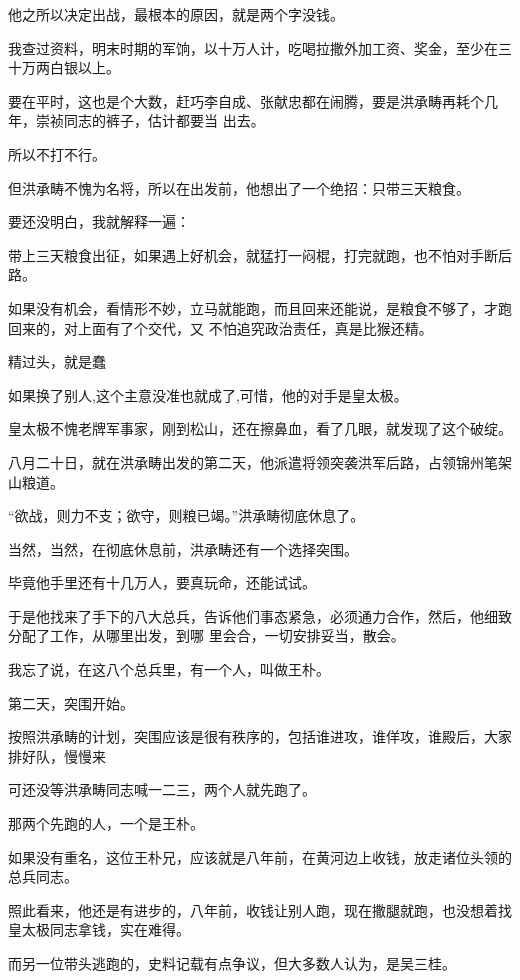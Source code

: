 \documentclass[11pt,a4paper,onecolumn]{article}
\begin{document}
他之所以决定出战，最根本的原因，就是两个字\myrule 没钱。

我查过资料，明末时期的军饷，以十万人计，吃喝拉撒外加工资、奖金，至少在三十万两白银以上。

要在平时，这也是个大数，赶巧李自成、张献忠都在闹腾，要是洪承畴再耗个几年，崇祯同志的裤子，估计都要当
出去。

所以不打不行。

但洪承畴不愧为名将，所以在出发前，他想出了一个绝招：只带三天粮食。

要还没明白，我就解释一遍：

带上三天粮食出征，如果遇上好机会，就猛打一闷棍，打完就跑，也不怕对手断后路。

如果没有机会，看情形不妙，立马就能跑，而且回来还能说，是粮食不够了，才跑回来的，对上面有了个交代，又
不怕追究政治责任，真是比猴还精。

精过头，就是蠢

如果换了别人,这个主意没准也就成了,可惜，他的对手是皇太极。

皇太极不愧老牌军事家，刚到松山，还在擦鼻血，看了几眼，就发现了这个破绽。

八月二十日，就在洪承畴出发的第二天，他派遣将领突袭洪军后路，占领锦州笔架山粮道。

``欲战，则力不支；欲守，则粮已竭。''洪承畴彻底休息了。

当然，当然，在彻底休息前，洪承畴还有一个选择\myrule 突围。

毕竟他手里还有十几万人，要真玩命，还能试试。

于是他找来了手下的八大总兵，告诉他们事态紧急，必须通力合作，然后，他细致分配了工作，从哪里出发，到哪
里会合，一切安排妥当，散会。

我忘了说，在这八个总兵里，有一个人，叫做王朴。

第二天，突围开始。

按照洪承畴的计划，突围应该是很有秩序的，包括谁进攻，谁佯攻，谁殿后，大家排好队，慢慢来

可还没等洪承畴同志喊一二三，两个人就先跑了。

那两个先跑的人，一个是王朴。

如果没有重名，这位王朴兄，应该就是八年前，在黄河边上收钱，放走诸位头领的总兵同志。

照此看来，他还是有进步的，八年前，收钱让别人跑，现在撒腿就跑，也没想着找皇太极同志拿钱，实在难得。

而另一位带头逃跑的，史料记载有点争议，但大多数人认为，是吴三桂。

\section[\thesection]{}
\end{document}
